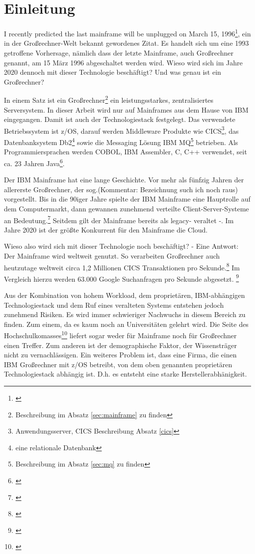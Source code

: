 \chapter{Einleitung}\label{ch:einleitung}
\glqq I recently predicted the last mainframe will be unplugged on March 15, 1996\grqq\footnote{\cite{Alsop.1993}}, ein in der Großrechner-Welt bekannt gewordenes Zitat.
Es handelt sich um eine 1993 getroffene Vorhersage, nämlich dass der letzte Mainframe, auch Großrechner genannt, am 15 März 1996 abgeschaltet werden wird.
Wieso wird sich im Jahre 2020 dennoch mit dieser Technologie beschäftigt? 
Und was genau ist ein Großrechner?

In einem Satz ist ein Großrechner\footnote{Beschreibung im Absatz \ref{sec:mainframe} zu finden} ein leistungsstarkes, zentralisiertes Serversystem.
In dieser Arbeit wird nur auf Mainframes aus dem Hause von IBM eingegangen.
Damit ist auch der Technologiestack festgelegt.
Das verwendete Betriebssystem ist z/OS, darauf werden Middleware Produkte wie CICS\footnote{Anwendungsserver, CICS Beschreibung Absatz \ref{cics}}, das Datenbanksystem Db2\footnote{eine relationale Datenbank} sowie die Messaging Lösung \glqq IBM MQ\grqq{}\footnote{Beschreibung im Absatz \ref{sec:mq} zu finden} betrieben.
Als Programmiersprachen werden COBOL, IBM Assembler, C, C++ verwendet, seit ca. 23 Jahren Java\footnote{\cite{Steegmans.2003}}.

Der IBM Mainframe hat eine lange Geschichte.
Vor mehr als fünfzig Jahren der allererste Großrechner, der sog.(Kommentar: Bezeichnung such ich noch raus) vorgestellt.
Bis in die 90iger Jahre spielte der IBM Mainframe eine Hauptrolle auf dem Computermarkt, dann gewannen zunehmend verteilte Client-Server-Systeme an Bedeutung.\footnote{\cite{Ceruzzi.2003}}
Seitdem gilt der Mainframe bereits als \glqq  legacy\grqq{}- veraltet -.
Im Jahre 2020 ist der größte Konkurrent für den Mainframe die Cloud.

Wieso also wird sich mit dieser Technologie noch beschäftigt? - Eine Antwort: Der Mainframe wird weltweit genutzt.
So verarbeiten Großrechner auch heutzutage weltweit circa 1,2 Millionen CICS Transaktionen pro Sekunde.\footnote{\cite{IBM.2019}}
Im Vergleich hierzu werden 63.000 Google Suchanfragen pro Sekunde abgesetzt. \footnote{\cite{Sullivan.2016}}

Aus der Kombination von hohem Workload, dem proprietären, IBM-abhängigen Technologiestack und dem Ruf eines veralteten Systems entstehen jedoch zunehmend Risiken.
Es wird immer schwieriger Nachwuchs in diesem Bereich zu finden.
Zum einem,  da es kaum noch an Universitäten gelehrt wird.
Die Seite des Hochschulkomasses\footnote{\cite{internetagenturKolnFrankfurtsunzinetTYPO3Programmmierung.}} liefert sogar weder für \glqq Mainframe\grqq{} noch für \glqq Großrechner\grqq{} einen Treffer.
Zum anderen ist der demographische Faktor, der Wissensträger nicht zu vernachlässigen.
Ein weiteres Problem ist, dass eine Firma, die einen IBM Großrechner mit z/OS betreibt, von dem oben genannten proprietären Technologiestack abhängig ist. 
D.h. es entsteht eine starke Herstellerabhänigkeit.

